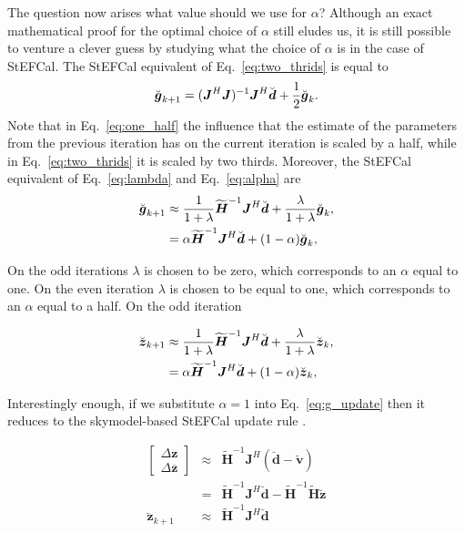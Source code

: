 \documentclass[useAMS,usenatbib]{mn2e}
\newcommand{\bz}{\bmath{z}}
\newcommand{\bg}{\bmath{g}}
\newcommand{\bd}{\bmath{d}}
\newcommand{\bJ}{\bmath{J}}
\newcommand{\bH}{\bmath{H}}
\newcommand{\conj}[1]{\overline{#1}}
\begin{document}
The question now arises what value should we use for $\alpha$? Although an exact mathematical proof for the optimal choice of $\alpha$ still eludes us, it is still possible to
venture a clever guess by studying what the choice of $\alpha$ is in the case of StEFCal. The StEFCal equivalent of Eq.~\eqref{eq:two_thrids}
is equal to
\begin{equation}
\label{eq:one_half}
\breve{\bg}_{k+1} = (\bJ^H\bJ)^{-1}\bJ^H\breve{\bd} + \frac{1}{2}\breve{\bg}_{k}. 
\end{equation}
Note that in Eq.~\eqref{eq:one_half} the influence that the estimate of the parameters from the previous iteration has on the current iteration is scaled by a half, while
in Eq.~\eqref{eq:two_thrids} it is scaled by two thirds. Moreover, the StEFCal equivalent of Eq.~\eqref{eq:lambda} and Eq.~\eqref{eq:alpha} are
\begin{align}
\breve{\bg}_{k+1} &\approx \frac{1}{1+\lambda}\widetilde{\bH}^{-1}\bJ^H\breve{\bd} + \frac{\lambda}{1+\lambda} \breve{\bg}_k,\label{eq:stef_lambda}\\
 &= \alpha \widetilde{\bH}^{-1}\bJ^H\breve{\bd} + (1-\alpha)\breve{\bg}_k, \label{eq:stef_alpha}  
\end{align}

On the odd iterations $\lambda$ is chosen to be zero, which corresponds to an $\alpha$ equal to one. On the even iteration $\lambda$ is chosen to be equal to one, which corresponds
to an $\alpha$ equal to a half. On the odd iteration 

\begin{align}
\breve{\bz}_{k+1} &\approx \frac{1}{1+\lambda}\widetilde{\bH}^{-1}\bJ^H\breve{\bd} + \frac{\lambda}{1+\lambda} \breve{\bz}_k,\label{eq:lambda}\\
 &= \alpha \widetilde{\bH}^{-1}\bJ^H\breve{\bd} + (1-\alpha)\breve{\bz}_k, \label{eq:alpha}  
\end{align}







Interestingly enough, if we substitute $\alpha = 1$ into Eq.~\ref{eq:g_update} then it reduces to the skymodel-based StEFCal update rule .





\begin{eqnarray}
\begin{bmatrix} \Delta \boldsymbol{z}\\ \Delta \conj{\boldsymbol{z}} \end{bmatrix} &\approx& \widetilde{\boldsymbol{H}}^{-1}\boldsymbol{J}^H(\breve{\boldsymbol{d}}-\breve{\boldsymbol{v}})\\ 
&=& \widetilde{\boldsymbol{H}}^{-1}\boldsymbol{J}^H\breve{\boldsymbol{d}} -  \widetilde{\boldsymbol{H}}^{-1}\widetilde{\boldsymbol{H}}\breve{\boldsymbol{z}}\\
\breve{\boldsymbol{z}}_{k+1} &\approx& \widetilde{\boldsymbol{H}}^{-1}\boldsymbol{J}^H\breve{\boldsymbol{d}}
\end{eqnarray}
\end{document}
